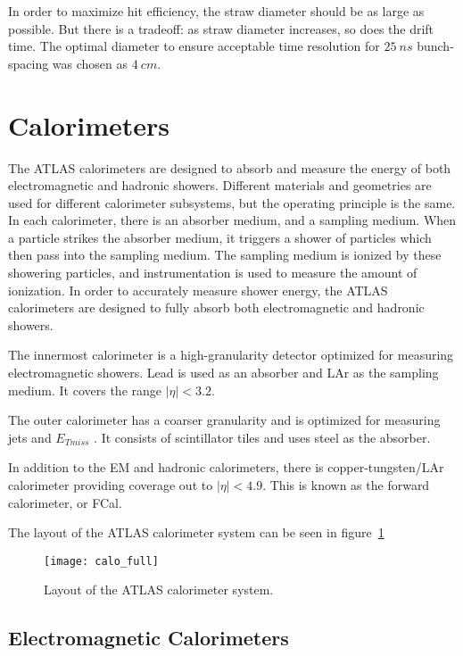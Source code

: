 In order to maximize hit efficiency, the straw diameter should be as large as possible.
But there is a tradeoff: as straw diameter increases, so does the drift time.
The optimal diameter to ensure acceptable time resolution for $25~ns$ bunch-spacing was chosen as $4~cm$.\cite{trt-2013}

\section{Calorimeters}\label{sec:calorimeters}

The ATLAS calorimeters are designed to absorb and measure the energy of both electromagnetic and hadronic showers.
Different materials and geometries are used for different calorimeter subsystems, but the operating principle is the same.
In each calorimeter, there is an absorber medium, and a sampling medium.
When a particle strikes the absorber medium, it triggers a shower of particles which then pass into the sampling medium.
The sampling medium is ionized by these showering particles, and instrumentation is used to measure the amount of ionization.
In order to accurately measure shower energy, the ATLAS calorimeters are designed to fully absorb both electromagnetic and hadronic showers.

The innermost calorimeter is a high-granularity detector optimized for measuring electromagnetic showers.
Lead is used as an absorber and LAr as the sampling medium.
It covers the range $|\eta| < 3.2$.

The outer calorimeter has a coarser granularity and is optimized for measuring jets and $E_{T miss}$ .
It consists of scintillator tiles and uses steel as the absorber.

In addition to the EM and hadronic calorimeters, there is copper-tungsten/LAr calorimeter providing coverage out to
$|\eta| < 4.9$.
This is known as the forward calorimeter, or FCal.

The layout of the ATLAS calorimeter system can be seen in figure~\ref{fig:calo_full}

\begin{figure}[h]
\texttt{[image: calo\_full]}
\caption{Layout of the ATLAS calorimeter system.}
\label{fig:calo_full}\cite{atlas-detector-2008}
\end{figure}

\subsection{Electromagnetic Calorimeters}\label{subsec:em_cal}

